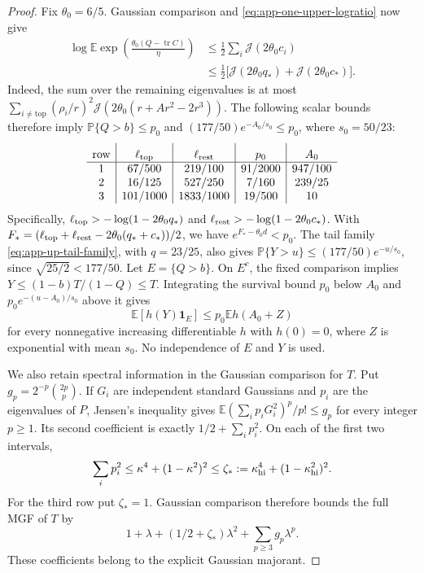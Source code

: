 \documentclass[11pt,a4paper]{article}
\numberwithin{equation}{section}
\begin{document}
\begin{proof}
Fix $\theta_0=6/5$.
Gaussian comparison and \eqref{eq:app-one-upper-logratio} now give
\[
 \begin{split}
 \log\mathbb E\exp\left(\frac{\theta_0(Q-\operatorname{tr}C)}\eta\right)
 &\le\frac12\sum_i\mathcal J(2\theta_0c_i)\\
 &\le\frac12\bigl[\mathcal J(2\theta_0q_*)+
                         \mathcal J(2\theta_0c_*)\bigr].
 \end{split}
\]
Indeed, the sum over the remaining eigenvalues is at most
$\sum_{i\ne\mathrm{top}}(\rho_i/r)^2
 \mathcal J(2\theta_0(r+Ar^2-2r^3))$.
The following scalar bounds therefore imply
$\mathbb P\{Q>b\}\le p_0$ and
$(177/50)e^{-A_0/s_0}\le p_0$, where $s_0=50/23$:
\[
\begin{array}{c|c|c|c|c}
 \text{row}&\ell_{\rm top}&\ell_{\rm rest}&p_0&A_0\rule{0pt}{3ex}\\ \hline
 1&67/500&219/100&91/2000&947/100\\
 2&16/125&527/250&7/160&239/25\\
 3&101/1000&1833/1000&19/500&10
\end{array}
\]
Specifically, $\ell_{\rm top}>-\log(1-2\theta_0q_*)$ and
$\ell_{\rm rest}>-\log(1-2\theta_0c_*)$.
With
$F_*=(\ell_{\rm top}+\ell_{\rm rest}-2\theta_0(q_*+c_*))/2$,
we have $e^{F_*-\theta_0d}<p_0$.
The tail family \eqref{eq:app-up-tail-family}, with $q=23/25$, also gives
$\mathbb P\{Y>u\}\le(177/50)e^{-u/s_0}$, since
$\sqrt{25/2}<177/50$.
Let $E=\{Q>b\}$. On $E^c$, the fixed comparison implies
$Y\le(1-b)T/(1-Q)\le T$.
Integrating the survival bound $p_0$ below $A_0$ and
$p_0e^{-(u-A_0)/s_0}$ above it gives
\begin{equation}\label{eq:app-one-upper-rare}
 \mathbb E[h(Y)\mathbf1_E]\le p_0\mathbb E h(A_0+Z)
\end{equation}
for every nonnegative increasing differentiable $h$ with $h(0)=0$,
where $Z$ is exponential with mean $s_0$.
No independence of $E$ and $Y$ is used.

We also retain spectral information in the Gaussian comparison for $T$.
Put $g_p=2^{-p}\binom{2p}{p}$.
If $G_i$ are independent standard Gaussians and $p_i$ are the eigenvalues
of $P$, Jensen's inequality gives
$\mathbb E(\sum_i p_iG_i^2)^p/p!\le g_p$ for every integer $p\ge1$.
Its second coefficient is exactly
$1/2+\sum_i p_i^2$.
On each of the first two intervals,
\[
 \sum_i p_i^2\le\kappa^4+(1-\kappa^2)^2
 \le\zeta_*:=\kappa_{\rm hi}^4+(1-\kappa_{\rm hi}^2)^2.
\]
For the third row put $\zeta_*=1$.
Gaussian comparison therefore bounds the full MGF of $T$ by
\[
 1+\lambda+(1/2+\zeta_*)\lambda^2+
 \sum_{p\ge3}g_p\lambda^p.
\]
These coefficients belong to the explicit Gaussian majorant.


\end{proof}
\end{document}
